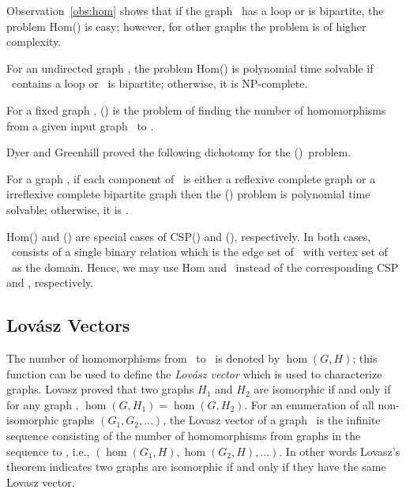 Observation~\ref{obs:hom} shows that if the graph \mH\ has a loop or is bipartite,
the problem  Hom(\mH) is easy; however, for other graphs the problem is of higher complexity.

\begin{theorem} 
For an undirected graph \mH, the problem Hom(\mH) is polynomial time solvable if 
\mH\ contains a loop or \mH\ is bipartite; otherwise, it is NP-complete.
\end{theorem}

\begin{defi}[\chom(\mH)]
For a fixed graph \mH,
\chom(\mH) is the problem of finding the number of homomorphisms from a given 
input graph \mG\ to \mH.
\end{defi}

Dyer and Greenhill proved the following dichotomy for the \chom(\mH)\ problem.
\begin{theorem} 
For a graph \mH, if each component of \mH\ is either a reflexive complete graph
or a irreflexive complete bipartite graph then the \chom(\mH) problem 
is polynomial time solvable; otherwise, it is \cpc\@.
\end{theorem}

Hom(\mH) and \chom(\mH) are special cases of CSP(\mrelset) and \ccsp(\mrelset),
respectively. In both cases, \mrelset\ consists of a single binary relation which is the
edge set of \mH\ with vertex set of \mH\ as the domain.
Hence, we may use Hom and \chom\ instead of
the corresponding CSP and \ccsp, respectively. 

\subsection*{Lov\'{a}sz Vectors}
The number of homomorphisms from \mG\ to \mH\ is denoted by \(\hom(G,H)\); this function
can be used to define the \emph{Lov\'{a}sz vector} which is used to characterize graphs.
Lovasz \cite{lovasz} proved that
two graphs \(H_1\) and \(H_2\) are isomorphic if and only if for any graph \mG,
\(\hom(G,H_1)=\hom(G,H_2)\). 
For an enumeration of all non-isomorphic graphs \((G_1,G_2,\dotsc)\), 
the Lovasz vector of a graph \mH\ is the infinite sequence consisting of the number of
homomorphisms from graphs in the sequence to \mH, i.e.,
\((\hom(G_1,H), \hom(G_2,H), \dotsc)\)\@. 
In other words Lovasz's theorem indicates two graphs are isomorphic if and only if
they have the same Lovasz vector.  
\begin{comment}
Lov\'{a}sz and et al. \cite{propertytesting} used the Lov\'{a}sz vector
for \emph{Edge Reconstruction} problem over graphs with sufficiently many edges, 
They also used Lov\'{a}sz vector in the {\em Property Testing} area.
In this model there is usually a huge graph and at each step only small sample of vertices
can be examined. The goal is to infer parameters of the graph using small samples of it. 
A good example of such a graph one might want to find the properties is the Internet.
\end{comment}

